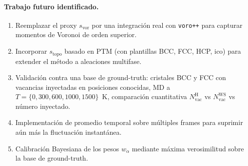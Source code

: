 \documentclass[11pt,a4paper]{article}
\theoremstyle{remark}
\begin{document}
\paragraph{Trabajo futuro identificado.}
\begin{enumerate}[label=(\arabic*)]
\item Reemplazar el proxy $s_\text{vor}$ por una integración real con
      \texttt{voro++} para capturar momentos de Voronoi de orden
      superior.
\item Incorporar $s_\text{topo}$ basado en PTM (con plantillas BCC,
      FCC, HCP, ico) para extender el método a aleaciones multifase.
\item Validación contra una base de ground-truth: cristales BCC y
      FCC con vacancias inyectadas en posiciones conocidas, MD a
      $T = \{0, 300, 600, 1000, 1500\}$~K, comparación cuantitativa
      $N_\text{vac}^\text{H}$ vs $N_\text{vac}^\text{WS}$ vs número
      inyectado.
\item Implementación de promedio temporal sobre múltiples frames
      para suprimir aún más la fluctuación instantánea.
\item Calibración Bayesiana de los pesos $w_\alpha$ mediante
      máxima verosimilitud sobre la base de ground-truth.
\end{enumerate}
\end{document}
